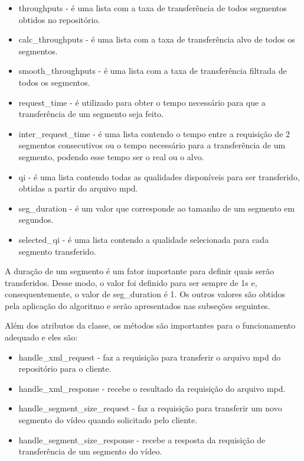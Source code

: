 \documentclass[10pt,twocolumn,letterpaper]{article}
\begin{document}
\begin{itemize}
	\item throughputs - é uma lista com a taxa de transferência de todos segmentos obtidos no repositório.
	\item calc\_throughputs - é uma lista com a taxa de transferência alvo de todos os segmentos.
	\item smooth\_throughputs - é uma lista com a taxa de transferência filtrada de todos os segmentos.
	\item request\_time - é utilizado para obter o tempo necessário para que a transferência de um segmento seja feito.
	\item inter\_request\_time - é uma lista contendo o tempo entre a requisição de 2 segmentos consecutivos ou o tempo necessário para a transferência de um segmento, podendo esse tempo ser o real ou o alvo.
	\item qi - é uma lista contendo todas as qualidades disponíveis para ser transferido, obtidas a partir do arquivo mpd.
	\item seg\_duration - é um valor que corresponde ao tamanho de um segmento em segundos.
	\item selected\_qi - é uma lista contendo a qualidade selecionada para cada segmento transferido.
\end{itemize}

A duração de um segmento é um fator importante para definir quais serão transferidos. Desse modo, o valor foi definido para ser sempre de 1s e, consequentemente, o valor de seg\_duration é 1. Os outros valores são obtidos pela aplicação do algoritmo e serão apresentados nas subseções seguintes.

Além dos atributos da classe, os métodos são importantes para o funcionamento adequado e eles são:

\begin{itemize}
	\item handle\_xml\_request - faz a requisição para transferir o arquivo mpd do repositório para o cliente.
	\item handle\_xml\_response - recebe o resultado da requisição do arquivo mpd.
	\item handle\_segment\_size\_request - faz a requisição para transferir um novo segmento do vídeo quando solicitado pelo cliente.
	\item handle\_segment\_size\_response - recebe a resposta da requisição de transferência de um segmento do vídeo.
\end{itemize}
\end{document}
